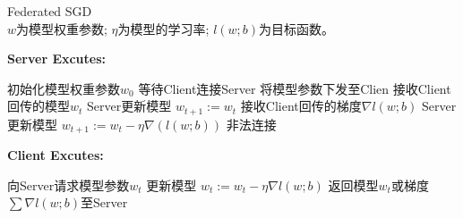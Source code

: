 \begin{algorithm}[h]
\caption{Federated SGD
\\$w$为模型权重参数; $\eta$为模型的学习率; $l(w;b)$为目标函数。}
\label{FedSGDServer}
{\bfseries Server Excutes:}
\begin{algorithmic}
\STATE 初始化模型权重参数$w_0$
\REPEAT
\STATE 等待Client连接Server
\STATE 将模型参数下发至Clien
\STATE 接收Client回传的模型$w_t$
\STATE Server更新模型 $w_{t+1} := w_{t}$
\STATE 接收Client回传的梯度$\nabla{l(w;b)}$
\STATE Server更新模型 $w_{t+1} := w_t - \eta\nabla(l(w;b))$
\ELSE
\STATE 非法连接
\ENDIF
{}
\end{algorithmic}
{\bfseries Client Excutes:}
\begin{algorithmic}
\STATE 向Server请求模型参数$w_t$
\STATE 更新模型 $w_t := w_t-\eta\nabla{l(w;b)}$
\ENDFOR
\STATE 返回模型$w_t$或梯度$\sum{\nabla{l(w;b)}}$至Server 
\end{algorithmic}
\end{algorithm}